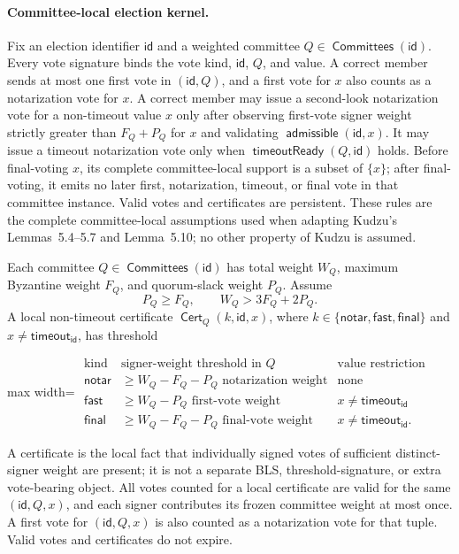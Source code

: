 \documentclass[sigplan,twocolumn,review,anonymous]{acmart}
\newcommand{\func}[1]{\operatorname{\mathsf{#1}}}
\newcommand{\Cert}{\func{Cert}}
\newcommand{\id}{\mathsf{id}}
\newcommand{\admissible}{\func{admissible}}
\newcommand{\timeoutVal}{\mathsf{timeout}}
\newcommand{\notarKind}{\mathsf{notar}}
\newcommand{\fastKind}{\mathsf{fast}}
\newcommand{\finalKind}{\mathsf{final}}
\newcommand{\Committees}{\func{Committees}}
\newcommand{\timeoutReady}{\func{timeoutReady}}
\begin{document}
\paragraph{Committee-local election kernel.}
Fix an election identifier \(\id\) and a weighted committee \(Q\in\Committees(\id)\).  Every vote
signature binds the vote kind, \(\id\), \(Q\), and value.  A correct member sends at most one first
vote in \((\id,Q)\), and a first vote for \(x\) also counts as a notarization vote for \(x\).  A
correct member may issue a second-look notarization vote for a non-timeout value \(x\) only after
observing first-vote signer weight strictly greater than \(F_Q+P_Q\) for \(x\) and validating
\(\admissible(\id,x)\).  It may issue a timeout notarization vote only when
\(\timeoutReady(Q,\id)\) holds.  Before final-voting \(x\), its complete committee-local support is a
subset of \(\{x\}\); after final-voting, it emits no later first, notarization, timeout, or final vote
in that committee instance.  Valid votes and certificates are persistent.  These rules are the complete
committee-local assumptions used when adapting Kudzu's Lemmas~5.4--5.7 and Lemma~5.10; no other
property of Kudzu is assumed.

Each committee \(Q\in\Committees(\id)\) has total weight \(W_Q\), maximum Byzantine weight
\(F_Q\), and quorum-slack weight \(P_Q\).  Assume
\[
P_Q\ge F_Q,
\qquad
W_Q>3F_Q+2P_Q.
\]
A local non-timeout certificate \(\Cert_Q(k,\id,x)\), where
\(k\in\{\notarKind,\fastKind,\finalKind\}\) and \(x\neq\timeoutVal_\id\), has threshold
\begin{center}
\begin{adjustbox}{max width=\columnwidth}
\(\displaystyle
\begin{array}{c|c|c}
\text{kind} & \text{signer-weight threshold in }Q & \text{value restriction}\\
\hline
\notarKind & \ge W_Q-F_Q-P_Q \text{ notarization weight} & \text{none}\\
\fastKind & \ge W_Q-P_Q \text{ first-vote weight} & x\neq\timeoutVal_\id\\
\finalKind & \ge W_Q-F_Q-P_Q \text{ final-vote weight} & x\neq\timeoutVal_\id.
\end{array}
\)
\end{adjustbox}
\end{center}
A certificate is the local fact that individually signed votes of sufficient distinct-signer weight are
present; it is not a separate BLS, threshold-signature, or extra vote-bearing object.  All votes counted
for a local certificate are valid for the same \((\id,Q,x)\), and each signer contributes its frozen
committee weight at most once.  A first vote for \((\id,Q,x)\) is also counted as a notarization vote
for that tuple.  Valid votes and certificates do not expire.
\end{document}
